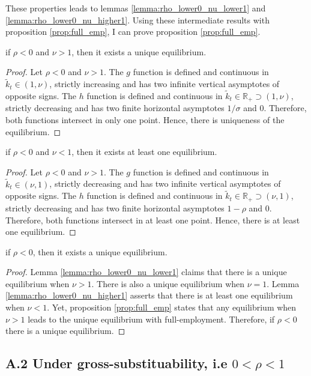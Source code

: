 These properties leads to lemmas \ref{lemma:rho_lower0_nu_lower1} and \ref{lemma:rho_lower0_nu_higher1}. Using these intermediate results with proposition \ref{prop:full_emp}, I can prove proposition \ref{prop:full_emp}.
\begin{lemma}\label{lemma:rho_lower0_nu_lower1}
	if $\rho < 0$ and $\nu > 1$, then it exists a unique equilibrium.
\end{lemma}
\begin{proof}
	Let $\rho < 0$ and $\nu > 1$. The $g$ function is defined and continuous in $\tilde{k}_t \in \left(1, \nu \right)$, strictly increasing and has two infinite vertical asymptotes of opposite signs. The $h$ function is defined and continuous in $\tilde{k}_t \in \mathbb{R}_+ \supset \left(1, \nu \right)$, strictly decreasing and has two finite horizontal asymptotes $1/\sigma$ and $0$. Therefore, both functions intersect in only one point. Hence, there is uniqueness of the equilibrium.
\end{proof}
\begin{lemma}\label{lemma:rho_lower0_nu_higher1}
	if $\rho < 0$ and $\nu < 1$, then it exists at least one equilibrium.
\end{lemma}
\begin{proof}
	Let $\rho < 0$ and $\nu > 1$. The $g$ function is defined and continuous in $\tilde{k}_t \in \left(\nu, 1\right)$, strictly decreasing and has two infinite vertical asymptotes of opposite signs. The $h$ function is defined and continuous in $\tilde{k}_t \in \mathbb{R}_+ \supset \left(\nu, 1\right)$, strictly decreasing and has two finite horizontal asymptotes $1-\rho$ and $0$. Therefore, both functions intersect in at least one point. Hence, there is at least one equilibrium.
\end{proof}
\begin{proposition}
	if $\rho < 0$, then it exists a unique equilibrium.
\end{proposition}
\begin{proof}
	Lemma \ref{lemma:rho_lower0_nu_lower1} claims that there is a unique equilibrium when $\nu > 1$. There is also a unique equilibrium when $\nu = 1$. Lemma \ref{lemma:rho_lower0_nu_higher1} asserts that there is at least one equilibrium when $\nu < 1$. Yet, proposition \ref{prop:full_emp} states that any equilibrium when $\nu > 1$ leads to the unique equilibrium with full-employment. Therefore, if $\rho < 0$ there is a unique equilibrium.
\end{proof}

\subsection*{A.2 Under gross-substituability, i.e $0 < \rho < 1$}

